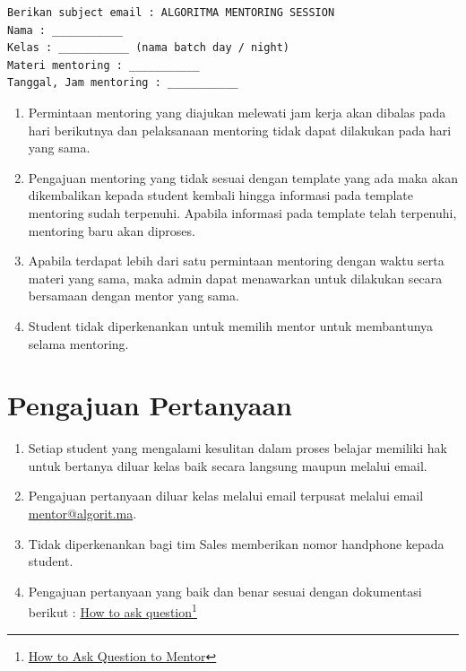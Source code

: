 \documentclass[
]{book}
\providecommand{\tightlist}{%
  \setlength{\itemsep}{0pt}\setlength{\parskip}{0pt}}
\begin{document}
\begin{verbatim}
Berikan subject email : ALGORITMA MENTORING SESSION
Nama : ___________
Kelas : ___________ (nama batch day / night)
Materi mentoring : ___________
Tanggal, Jam mentoring : ___________
\end{verbatim}

\begin{enumerate}
\def\labelenumi{\arabic{enumi}.}
\setcounter{enumi}{3}
\tightlist
\item
  Permintaan mentoring yang diajukan melewati jam kerja akan dibalas pada hari berikutnya dan pelaksanaan mentoring tidak dapat dilakukan pada hari yang sama.
\item
  Pengajuan mentoring yang tidak sesuai dengan template yang ada maka akan dikembalikan kepada student kembali hingga informasi pada template mentoring sudah terpenuhi. Apabila informasi pada template telah terpenuhi, mentoring baru akan diproses.
\item
  Apabila terdapat lebih dari satu permintaan mentoring dengan waktu serta materi yang sama, maka admin dapat menawarkan untuk dilakukan secara bersamaan dengan mentor yang sama.
\item
  Student tidak diperkenankan untuk memilih mentor untuk membantunya selama mentoring.
\end{enumerate}

\hypertarget{pengajuan-pertanyaan}{%
\section{Pengajuan Pertanyaan}\label{pengajuan-pertanyaan}}

\begin{enumerate}
\def\labelenumi{\arabic{enumi}.}
\tightlist
\item
  Setiap student yang mengalami kesulitan dalam proses belajar memiliki hak untuk bertanya diluar kelas baik secara langsung maupun melalui email.
\item
  Pengajuan pertanyaan diluar kelas melalui email terpusat melalui email \url{mentor@algorit.ma}.
\item
  Tidak diperkenankan bagi tim Sales memberikan nomor handphone kepada student.
\item
  Pengajuan pertanyaan yang baik dan benar sesuai dengan dokumentasi berikut : \href{https://drive.google.com/file/d/1gWSTNF3wXK5Lbfssb-eT_A3gbnLvY_ez/view?usp=sharing}{How to ask question}\footnote{\href{https://drive.google.com/file/d/1gWSTNF3wXK5Lbfssb-eT_A3gbnLvY_ez/view?usp=sharing}{How to Ask Question to Mentor}}
\end{enumerate}
\end{document}
